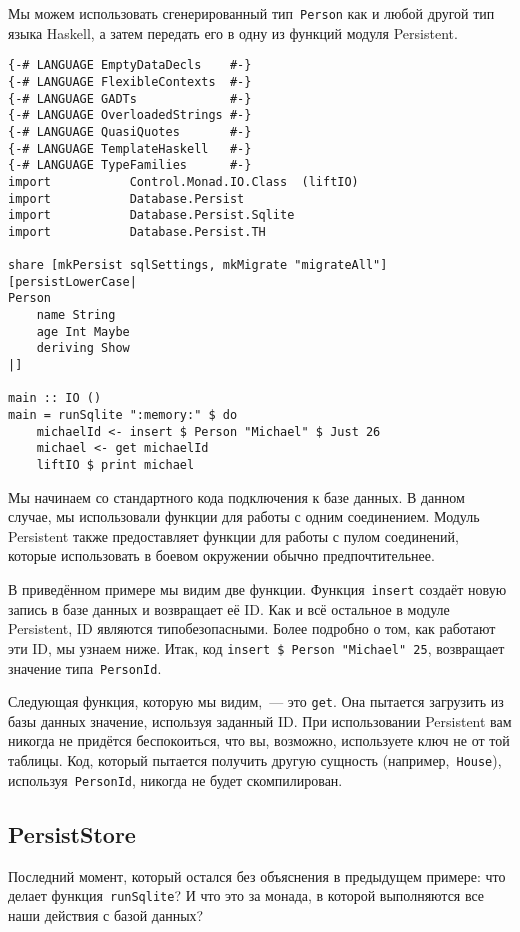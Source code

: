 Мы можем использовать сгенерированный тип~\lstinline'Person' как и любой другой
тип языка Haskell, а затем передать его в одну из функций модуля Persistent.

\begin{lstlisting}
{-# LANGUAGE EmptyDataDecls    #-}
{-# LANGUAGE FlexibleContexts  #-}
{-# LANGUAGE GADTs             #-}
{-# LANGUAGE OverloadedStrings #-}
{-# LANGUAGE QuasiQuotes       #-}
{-# LANGUAGE TemplateHaskell   #-}
{-# LANGUAGE TypeFamilies      #-}
import           Control.Monad.IO.Class  (liftIO)
import           Database.Persist
import           Database.Persist.Sqlite
import           Database.Persist.TH

share [mkPersist sqlSettings, mkMigrate "migrateAll"] [persistLowerCase|
Person
    name String
    age Int Maybe
    deriving Show
|]

main :: IO ()
main = runSqlite ":memory:" $ do
    michaelId <- insert $ Person "Michael" $ Just 26
    michael <- get michaelId
    liftIO $ print michael
\end{lstlisting}

Мы начинаем со стандартного кода подключения к базе данных. В данном случае, мы
использовали функции для работы с одним соединением. Модуль Persistent также
предоставляет функции для работы с пулом соединений, которые использовать в
боевом окружении обычно предпочтительнее.

В приведённом примере мы видим две функции. Функция~\lstinline'insert' создаёт новую запись
в базе данных и возвращает её ID. Как и всё остальное в модуле Persistent, ID
являются типобезопасными. Более подробно о том, как работают эти ID, мы узнаем
ниже. Итак, код \lstinline'insert $ Person "Michael" 25',
возвращает значение типа~\lstinline'PersonId'.

Следующая функция, которую мы видим,~--- это \lstinline'get'. Она пытается
загрузить из базы данных значение, используя заданный ID. При использовании
Persistent вам никогда не придётся беспокоиться, что вы, возможно, используете
ключ не от той таблицы. Код, который пытается получить другую сущность
(например,~\lstinline'House'), используя~\lstinline'PersonId', никогда не будет
скомпилирован.

\subsection{PersistStore}

Последний момент, который остался без объяснения в предыдущем примере: что
делает функция~\lstinline'runSqlite'? И что это за монада, в которой
выполняются все наши действия с базой данных?

